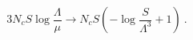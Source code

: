 \begin{equation}
3N_cS\log{\frac{\Lambda}{\mu}} \to N_cS\left(-\log{\frac{S}{\Lambda^3}}+1 
\right) ~.
\end{equation}

